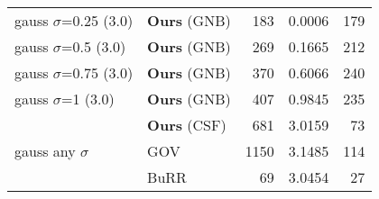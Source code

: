 \begin{tabular}{ll rrr}
  \multirow{1}{*}{gauss $\sigma$=0.25 (3.0)} & \textbf{Ours} (GNB) & 183 & 0.0006 & 179 \\
   \multirow{1}{*}{gauss $\sigma$=0.5 (3.0)} & \textbf{Ours} (GNB) & 269 & 0.1665 & 212 \\
  \multirow{1}{*}{gauss $\sigma$=0.75 (3.0)} & \textbf{Ours} (GNB) & 370 & 0.6066 & 240 \\
     \multirow{1}{*}{gauss $\sigma$=1 (3.0)} & \textbf{Ours} (GNB) & 407 & 0.9845 & 235 \\


\midrule\multirow{3}{*}{gauss any $\sigma$}

   & \textbf{Ours} (CSF) &  681 & 3.0159 &  73 \\
   &                 GOV & 1150 & 3.1485 & 114 \\
   &                BuRR &   69 & 3.0454 &  27 \\

		\bottomrule

	\end{tabular}

